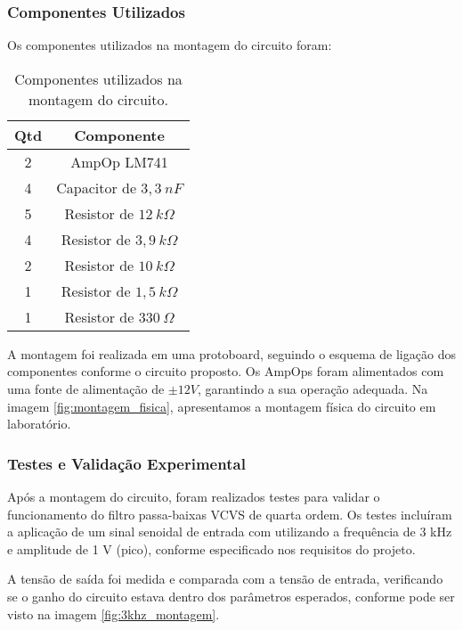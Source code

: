 \subsubsection{Componentes Utilizados}
Os componentes utilizados na montagem do circuito foram:

\begin{table}[H]
\centering
\begin{tabular}{|c|c|}
\hline
\textbf{Qtd} & \textbf{Componente} \\
\hline
2 & AmpOp LM741 \\
\hline
4 & Capacitor de $3,3~nF$ \\
\hline
5 & Resistor de $12~k\Omega$ \\
\hline
4 & Resistor de $3,9~k\Omega$ \\
\hline
2 & Resistor de $10~k\Omega$ \\
\hline
1 & Resistor de $1,5~k\Omega$ \\
\hline
1 & Resistor de $330~\Omega$ \\
\hline
\end{tabular}
\caption{Componentes utilizados na montagem do circuito.}
\label{tab:componentes_montagem}
\end{table}

A montagem foi realizada em uma protoboard, seguindo o esquema de ligação dos componentes conforme o circuito proposto. Os AmpOps foram alimentados com uma fonte de alimentação de $\pm12 V$, garantindo a sua operação adequada. Na imagem \ref{fig:montagem_fisica}, apresentamos a montagem física do circuito em laboratório.


\subsubsection{Testes e Validação Experimental}
Após a montagem do circuito, foram realizados testes para validar o funcionamento do filtro passa-baixas VCVS de quarta ordem. Os testes incluíram a aplicação de um sinal senoidal de entrada com utilizando a frequência de 3 kHz e amplitude de 1 V (pico), conforme especificado nos requisitos do projeto. 

A tensão de saída foi medida e comparada com a tensão de entrada, verificando se o ganho do circuito estava dentro dos parâmetros esperados, conforme pode ser visto na imagem \ref{fig:3khz_montagem}.


